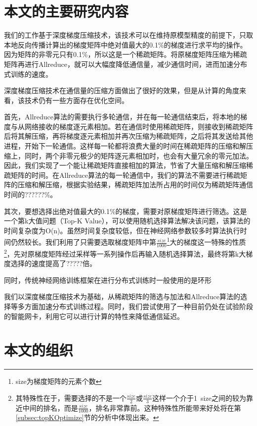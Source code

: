 \section{本文的主要研究内容}
我们的工作基于深度梯度压缩技术，该技术可以在维持原模型精度的前提下，只取本地反向传播计算出的梯度矩阵中绝对值最大的0.1\%的梯度进行求平均的操作。因为矩阵的非零元只有0.1\%，所以这是一个稀疏矩阵。将原梯度矩阵压缩为稀疏矩阵再进行Allreduce，就可以大幅度降低通信量，减少通信时间，进而加速分布式训练的速度。

深度梯度压缩技术在通信量的压缩方面做出了很好的效果，但是从计算的角度来看，该技术仍有一些方面存在优化空间。

首先，Allreduce算法的需要执行多轮通信，并在每一轮通信结束后，将本地的梯度与从网络接收的梯度逐元素相加。若在通信时使用稀疏矩阵，则接收到稀疏矩阵后将其解压缩，再将梯度逐元素相加并再次压缩为稀疏矩阵，之后将其发送给其他进程，开始下一轮通信。这样每一轮都将浪费大量的时间在稀疏矩阵的压缩和解压缩上，同时，两个非零元极少的矩阵逐元素相加时，也会有大量冗余的零元加法。因此，我们实现了一个能让稀疏矩阵直接相加的算法，节省了大量压缩和解压缩稀疏矩阵的时间。在Allreduce算法的每一轮通信中，我们的算法不需要进行稀疏矩阵的压缩和解压缩，根据实验结果，稀疏矩阵加法所占用的时间仅为稀疏矩阵通信时间的??????\%。

其次，要想选择出绝对值最大的0.1\%的梯度，需要对原梯度矩阵进行筛选。这是一个第k大值问题（Top-K Value），可以使用随机选择算法解决该问题，该算法的时间复杂度为O(n)。虽然时间复杂度较低，但在神经网络参数较多时算法执行时间仍然较长。我们利用了只需要选取梯度矩阵中第$\frac{size}{1000}$\footnote{size为梯度矩阵的元素个数}大的梯度这一特殊的性质\footnote{其特殊性在于，需要选择的不是一个$\frac{size}{2}$或$\frac{size}{3}$这样一个介于1~size之间的较为靠近中间的排名，而是$\frac{size}{1000}$，排名非常靠前。这种特殊性所能带来好处将在第\ref{subsec:topKOptimize}节的分析中体现出来。}，先对原梯度矩阵经过采样等一系列操作后再输入随机选择算法，最终将第k大梯度选择的速度提高了?????倍。

同时，传统神经网络训练框架在进行分布式训练时一般使用的是环形

我们以深度梯度压缩技术为基础，从稀疏矩阵的筛选与加法和Allreduce算法的选择等多方面加速分布式训练过程。同时，我们尝试使用了一种目前仍处在试验阶段的智能网卡，利用它可以进行计算的特性来降低通信延迟。

\section{本文的组织}